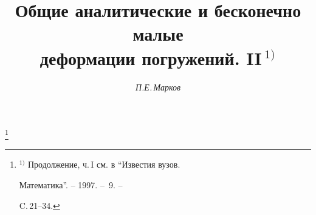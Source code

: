 









\newcommand{\const}{\operatorname{const}}


\newcommand{\sv}[2]{\overset{#1}{#2}{}}


\newcommand{\tts}[1]{}


\addtocounter{section}{2}


\addtocounter{equation}{24}


\addtocounter{thm}{3}


\addtocounter{lem}{6}







 


\setcounter{page}{41} 












\author{\it П.Е.\,Марков} 


\title{Общие аналитические и бесконечно малые\\


деформации погружений. II\,${}^{1)}$} 


 


\thanks{${}^{1)}$ Продолжение, ч.\,I см. в ``Известия вузов.


Математика''. -- 1997. -- \No\,9. --


C.\,21--34.} 


\date{} 



